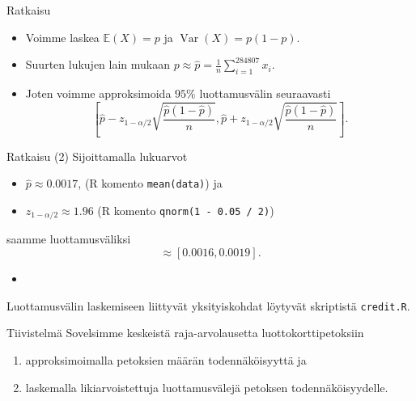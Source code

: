 \documentclass{beamer}
\DeclareMathOperator{\var}{Var}
\begin{document}

\begin{frame}{Ratkaisu}
  \begin{itemize}
    \item Voimme laskea $\mathbb{E}\left(X\right) = p$ ja $\var\left(X\right) =
    p(1-p)$.
    \item Suurten lukujen lain mukaan $p \approx \hat p =
    \frac{1}{n}\sum_{i=1}^{284807} x_i$.
    \item Joten voimme approksimoida $95\%$ luottamusvälin seuraavasti
    \begin{equation*}
      \left[\hat p - z_{1 - \alpha/2}\sqrt{\frac{\hat p(1-\hat p)}{n}},
      \hat p + z_{1 - \alpha/2}\sqrt{\frac{\hat p(1-\hat p)}{n}}\right].
    \end{equation*}
  \end{itemize}
\end{frame}


\begin{frame}{Ratkaisu (2)}
  Sijoittamalla lukuarvot
  \begin{itemize}
    \item $\hat p\approx 0.0017$, (\textsf{R} komento \texttt{mean(data)}) ja
    \item $z_{1 - \alpha / 2} \approx 1.96$ (\textsf{R} komento \texttt{qnorm(1
    - 0.05 / 2)})
  \end{itemize}
  saamme luottamusväliksi
  \begin{equation*}
    \approx \left[0.0016, 0.0019\right].
  \end{equation*}
  \pause
  \begin{itemize}
    \item[]
  \end{itemize}
  Luottamusvälin laskemiseen liittyvät yksityiskohdat löytyvät skriptistä
  \texttt{credit.R}. 
\end{frame}

\begin{frame}{Tiivistelmä}
  Sovelsimme keskeistä raja-arvolausetta luottokorttipetoksiin
  \begin{enumerate}
    \item approksimoimalla petoksien määrän todennäköisyyttä ja
    \item laskemalla likiarvoistettuja luottamusvälejä petoksen
    todennäköisyydelle.
  \end{enumerate}
\end{frame}
\end{document}
